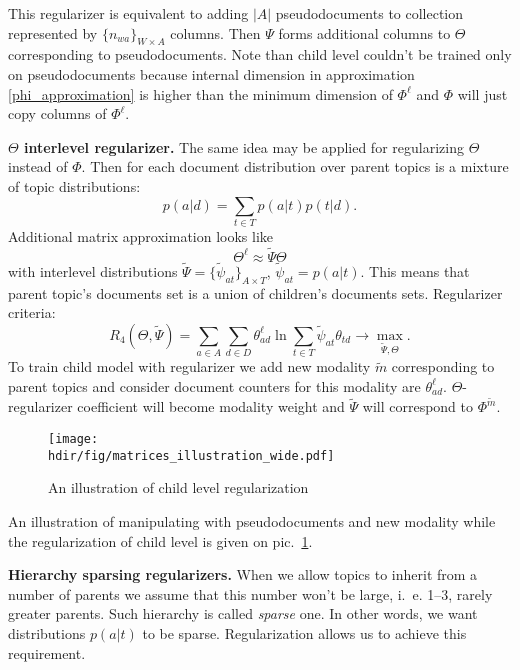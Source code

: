 \documentclass[12pt, twoside]{article}
\newcommand{\hdir}{.}
\begin{document}
This regularizer is equivalent to adding $|A|$ pseudodocuments to collection represented by $\{n_{wa}\}_{W \times A}$ columns. Then $\Psi$ forms additional columns to $\Theta$ corresponding to pseudodocuments.
Note than child level couldn't be trained only on pseudodocuments because internal dimension in approximation \eqref{phi_approximation} is higher than the minimum dimension of $\Phi^\ell$ and $\Phi$ will just copy columns of $\Phi^\ell$.

\textbf{$\Theta$ interlevel regularizer.}
The same idea may be applied for regularizing $\Theta$ instead of $\Phi$. Then for each document distribution over parent topics is a mixture of topic distributions:   %
\[
p(a|d) = \sum_{t \in T} p(a|t) p(t|d).
\]
Additional matrix approximation looks like
\begin{equation}
    \nonumber
    \Theta^\ell \approx \widetilde \Psi \Theta 
\end{equation}
with interlevel distributions $\widetilde \Psi = \{\tilde \psi_{at}\}_{A \times T}$, $\tilde \psi_{at} = p(a|t)$. This means that parent topic's documents set is a union of children's documents sets. Regularizer criteria:
\[
R_4(\Theta, \widetilde \Psi) = \sum_{a \in A} \sum_{d \in D} \theta^\ell_{ad} \ln \sum_{t \in T} \tilde \psi_{at} \theta_{td} \rightarrow \max_{\widetilde \Psi, \Theta}.
\]
To train child model with regularizer we add new modality $\tilde m$ corresponding to parent topics and consider document counters for this modality are $\theta^\ell_{ad}$. $\Theta$-regularizer coefficient will become modality weight and $\widetilde \Psi$ will correspond to $\Phi^{\tilde m}$.
\begin{figure}[!th]
	\begin{center}
	\texttt{[image: \\hdir/fig/matrices\_illustration\_wide.pdf]}
\end{center}
\caption{An illustration of child level regularization}
\label{fg:matrices}
\end{figure}

\vspace{0.5cm}
An illustration of manipulating with pseudodocuments and new modality while the regularization of child level is given on pic.~\ref{fg:matrices}.

\textbf{Hierarchy sparsing regularizers.}
When we allow topics to inherit from a number of parents we assume that this number won't be large, i.~e. 1--3, rarely greater parents. Such hierarchy is called \emph{sparse} one. In other words, we want distributions $p(a|t)$ to be sparse. Regularization allows us to achieve this requirement.
\end{document}
